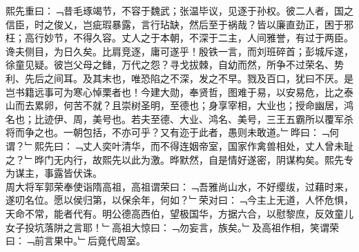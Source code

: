 熙先重曰：﹁昔毛琢竭节，不容于魏武；张温毕议，见逐于孙权。彼二人者，国之信臣，时之俊乂，岂疵瑕暴露，言行玷缺，然后至于祸哉？皆以廉直劲正，困于邪枉；高行妙节，不得久容。丈人之于本朝，不深于二主，人间雅誉，有过于两臣。谗夫侧目，为日久矣。比肩竞逐，庸可遂乎！殷铁一言，而刘班碎首；彭城斥遂，徐童见疑。彼岂父母之雠，万代之怨？寻戈拔棘，自幼而然，所争不过荣名、势利、先后之间耳。及其末也，唯恐陷之不深，发之不早。戮及百口，犹曰不厌。是岂书籍远事可为寒心悼栗者也！今建大勋，奉贤哲，图难于易，以安易危，比之泰山而去累卵，何苦不就？且崇树圣明，至德也；身享宰相，大业也；授命幽居，鸿名也；比迹伊、周，美号也。若夫至德、大业、鸿名、美号，三王五霸所以覆军杀将而争之也。一朝包括，不亦可乎？又有迩于此者，愚则未敢道。﹂晔曰：﹁何谓？﹂熙先曰：﹁丈人奕叶清华，而不得连姻帝室，国家作禽兽相处，丈人曾未耻之？﹂晔门无内行，故熙先以此为激。晔默然，自是情好遂密，阴谋构矣。熙先专为谋主，事露皆伏诛。
\\
周大将军郭荣奉使诣隋高祖，高祖谓荣曰：﹁吾雅尚山水，不好缨绂，过藉时来，遂叨名位。愿以侯归第，以保余年，何如？﹂荣对曰：﹁今主上无道，人怀危惧，天命不常，能者代有。明公德高西伯，望极国华，方据六合，以慰黎庶，反效童儿女子投坑落阱之言耶！﹂高祖大惊曰：﹁勿妄言，族矣。﹂及高祖作相，笑谓荣曰：﹁前言果中。﹂后竟代周室。
\\

